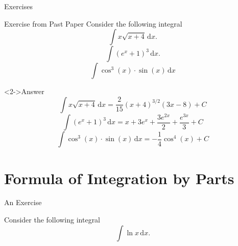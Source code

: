\documentclass[10pt, aspectratio=1610]{beamer}
\begin{document}
\begin{frame}{Exercises}
  \begin{exampleblock}{Exercise from Past Paper}
    Consider the following integral
    \[\int x\sqrt{x+4}\,\mathrm{d}x.\]
    \[\int (e^{x}+1)^{3}\,\mathrm{d}x.\]
    \[\int \cos^{3}{(x)}\cdot \sin{(x)}\,\mathrm{d}x\] %
  \end{exampleblock}
  \begin{block}<2->{Answer}
  \[\int x \sqrt{x + 4}\,\mathrm{d}x = \frac{2}{15}(x + 4)^{3/2} (3 x - 8) + C\]
  \[\int (e^{x} + 1)^{3}\,\mathrm{d}x = x + 3 e^x + \frac{3 e^{2x}}{2} + \frac{e^{3x}}{3} + C\]
  \[\int \cos^{3}{(x)}\cdot \sin{(x)}\,\mathrm{d}x = -\frac{1}{4}\cos^{4}{(x)}+C\]
  \end{block}
\end{frame}
\section{Formula of Integration by Parts}
\begin{frame}{An Exercise}\label{slide:1}
  \begin{tcolorbox}[enhanced,colback=red!5!white,frame style={left color=red!75!black,right color=blue!75!black},rounded corners,title=Example]
    Consider the following integral
    \[\int \ln{x}\,\mathrm{d}x.\]
    \hyperlink{slide:2}{}\\
    \pause
    \hyperlink{frame:4}{}
  \end{tcolorbox} 
\end{frame}
\end{document}

